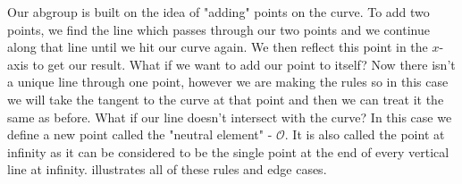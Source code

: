 Our \gls{abgroup} is built on the idea of "adding" points on the curve.
To add two points, we find the line which passes through our two points and we continue along that line until we hit our curve again.
We then reflect this point in the $x$-axis to get our result.
What if we want to add our point to itself? Now there isn't a unique line through one point, however we are making the rules so in this case we will take the tangent to the curve at that point and then we can treat it the same as before.
What if our line doesn't intersect with the curve? In this case we define a new point called the "neutral element" - $\mathcal{O}$.
It is also called the point at infinity as it can be considered to be the single point at the end of every vertical line at infinity.
 illustrates all of these rules and edge cases.

